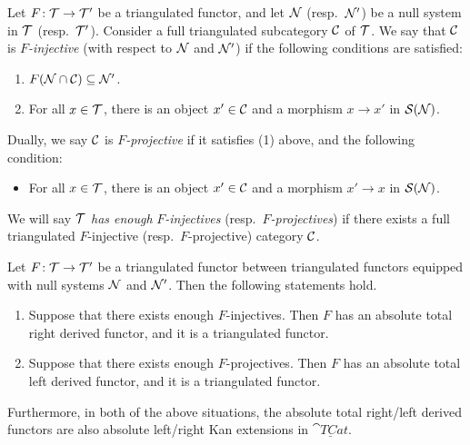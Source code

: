 \begin{definition}
	Let \(F\!:\mathcal{T}\to\mathcal{T}'\) be a triangulated functor, and let \(\mathcal{N}\) (resp.\ \(\mathcal{N}'\)) be a null system in \(\mathcal{T}\) (resp.\ \(\mathcal{T}'\)). Consider a full triangulated subcategory \(\mathcal{C}\)
	of \(\mathcal{T}\). We say that \(\mathcal{C}\) is \(F\)\emph{-injective} (with respect to \(\mathcal{N}\) and \(\mathcal{N}'\)) if the following conditions are satisfied:
	\begin{enumerate}[label=(\arabic*)]
	\item \(F(\mathcal{N}\cap\mathcal{C})\subseteq\mathcal{N}'\).
	\item For all \(x\in\mathcal{T}\), there is an object \(x'\in\mathcal{C}\) and a morphism \(x\to x'\) in \(\mathcal{S}(\mathcal{N})\).
	\end{enumerate}
	Dually, we say \(\mathcal{C}\) is \(F\)\emph{-projective} if it satisfies (1) above, and the following condition:
	\begin{itemize}[label=(2')]
	\item For all \(x\in\mathcal{T}\), there is an object \(x'\in\mathcal{C}\) and a morphism \(x'\to x\) in \(\mathcal{S}(\mathcal{N})\).
	\end{itemize}
	We will say \(\mathcal{T}\) \emph{has enough} \(F\)\emph{-injectives} (resp.\ \(F\)\emph{-projectives}) if there exists a full triangulated \(F\)-injective (resp.\ \(F\)-projective) category \(\mathcal{C}\).
\end{definition}
\begin{theorem}
	Let \(F\!:\mathcal{T}\to\mathcal{T}'\) be a triangulated functor between triangulated functors equipped with null systems \(\mathcal{N}\) and \(\mathcal{N}'\). Then the following statements hold.
	\begin{enumerate}[label=(\arabic*)]
	\item Suppose that there exists enough \(F\)-injectives. Then \(F\) has an absolute total right derived functor, and it is a triangulated functor.
	\item Suppose that there exists enough \(F\)-projectives. Then \(F\) has an absolute total left derived functor, and it is a triangulated functor.
	\end{enumerate}
	Furthermore, in both of the above situations, the absolute total right/left derived functors are also absolute left/right Kan extensions in \(\underline{\cat{TCat}}\).
\end{theorem}
